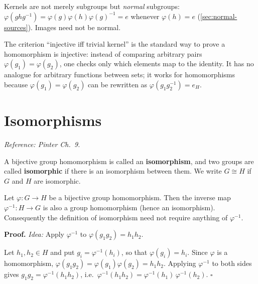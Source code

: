 \documentclass[11pt]{report}
\renewenvironment{proof}[1][Proof]{\noindent\textbf{#1.} }{\hfill$\square$\par\vspace{5pt}}
\begin{document}
\begin{rembox}\label{rem:kernels-normal-preview}
Kernels are not merely subgroups but \emph{normal} subgroups: $\varphi(ghg^{-1}) = \varphi(g)\varphi(h)\varphi(g)^{-1} = e$ whenever $\varphi(h) = e$ (\ref{sec:normal-sources}). Images need not be normal.
\end{rembox}

\begin{rembox}\label{rem:kernel-measure-non-injectivity}
The criterion ``injective iff trivial kernel'' is the standard way to prove a homomorphism is injective: instead of comparing arbitrary pairs $\varphi(g_1) = \varphi(g_2)$, one checks only which elements map to the identity. It has no analogue for arbitrary functions between sets; it works for homomorphisms because $\varphi(g_1) = \varphi(g_2)$ can be rewritten as $\varphi(g_1 g_2^{-1}) = e_H$.
\end{rembox}

\section{Isomorphisms}\label{sec:isos}

\textit{Reference: Pinter Ch.\ 9.}

\begin{defbox}\label{def:isomorphism-isomorphic-groups}
A bijective group homomorphism is called an \textbf{isomorphism}, and two groups are called \textbf{isomorphic} if there is an isomorphism between them. We write $G \cong H$ if $G$ and $H$ are isomorphic.
\end{defbox}

\begin{propbox}\label{prop:inverse-isomorphism-isomorphism}
Let $\varphi: G \to H$ be a bijective group homomorphism. Then the inverse map $\varphi^{-1}: H \to G$ is also a group homomorphism (hence an isomorphism). Consequently the definition of isomorphism need not require anything of $\varphi^{-1}$.
\end{propbox}

\begin{proof}
\textit{Idea:} Apply $\varphi^{-1}$ to $\varphi(g_1 g_2) = h_1 h_2$.\par
Let $h_1, h_2 \in H$ and put $g_i = \varphi^{-1}(h_i)$, so that $\varphi(g_i) = h_i$. Since $\varphi$ is a homomorphism, $\varphi(g_1 g_2) = \varphi(g_1)\varphi(g_2) = h_1 h_2$. Applying $\varphi^{-1}$ to both sides gives $g_1 g_2 = \varphi^{-1}(h_1 h_2)$, i.e.\ $\varphi^{-1}(h_1 h_2) = \varphi^{-1}(h_1)\,\varphi^{-1}(h_2)$.
\end{proof}
\end{document}

